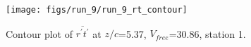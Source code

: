 \begin{figure}[H]
\centering
\texttt{[image: figs/run\_9/run\_9\_rt\_contour]}
\caption{Contour plot of $\overline{r^\prime t^\prime}$ at $z/c$=5.37, $V_{free}$=30.86, station 1.}
\label{fig:run_9_rt_contour}
\end{figure}


